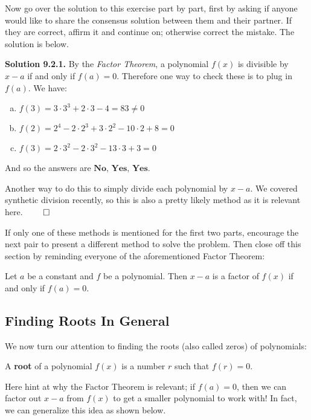 Now go over the solution to this exercise part by part, first by asking if anyone would like to share the consensus solution between them and their partner. If they are correct, affirm it and continue on; otherwise correct the mistake. The solution is below.

\textbf{Solution 9.2.1.} By the \emph{Factor Theorem}, a polynomial $f(x)$ is divisible by $x-a$ if and only if $f(a) = 0$. Therefore one way to check these is to plug in $f(a)$. We have:
\begin{enumerate}[(a)]
    \item $f(3) = 3\cdot 3^3 + 2\cdot 3 - 4 = 83 \neq 0$
    \item $f(2) = 2^4 - 2\cdot 2^3 + 3\cdot 2^2 - 10\cdot 2 + 8 = 0$
    \item $f(3) = 2\cdot 3^2 - 2\cdot 3^2 - 13\cdot 3 + 3 = 0$
\end{enumerate} And so the answers are $\boxed{\textbf{No, Yes, Yes}}$.

Another way to do this to simply divide each polynomial by $x-a$. We covered synthetic division recently, so this is also a pretty likely method as it is relevant here. \hspace*{\fill} $\qed$

If only one of these methods is mentioned for the first two parts, encourage the next pair to present a different method to solve the problem. Then close off this section by reminding everyone of the aforementioned Factor Theorem:

\begin{theorem}
    Let $a$ be a constant and $f$ be a polynomial. Then $x-a$ is a factor of $f(x)$ if and only if $f(a) = 0$.
\end{theorem}



\subsection{Finding Roots In General}

We now turn our attention to finding the roots (also called zeros) of polynomials:

\begin{definition}
    A \textbf{root} of a polynomial $f(x)$ is a number $r$ such that $f(r) = 0$.
\end{definition}

Here hint at why the Factor Theorem is relevant; if $f(a) = 0$, then we can factor out $x-a$ from $f(x)$ to get a smaller polynomial to work with! In fact, we can generalize this idea as shown below. 

